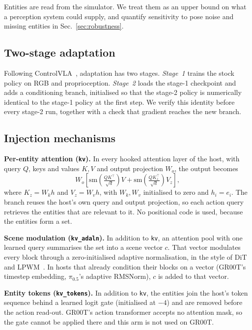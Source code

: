 \documentclass[letterpaper, 10pt, journal, twoside]{IEEEtran}
\newcommand{\arm}[1]{\texttt{#1}}
\begin{document}
Entities are read from the simulator. We treat them as an upper bound on
what a perception system could supply, and quantify sensitivity to pose
noise and missing entities in Sec.~\ref{sec:robustness}.

\subsection{Two-stage adaptation}
Following ControlVLA~\cite{li2025controlvla}, adaptation has two stages.
\textit{Stage~1} trains the stock policy on RGB and proprioception.
\textit{Stage~2} loads the stage-1 checkpoint and adds a conditioning branch,
initialised so that the stage-2 policy is numerically identical to the
stage-1 policy at the first step. We verify this identity before every
stage-2 run, together with a check that gradient reaches the new branch.

\subsection{Injection mechanisms}
\label{sec:injection}

\textbf{Per-entity attention (\arm{kv}).} In every hooked attention layer of
the host, with query $Q$, keys and values $K,V$ and output projection $W_o$,
the output becomes
\begin{equation}
  W_o\!\left[\mathrm{sm}\!\left(\tfrac{QK^\top}{\sqrt d}\right)V +
  \mathrm{sm}\!\left(\tfrac{QK_z^\top}{\sqrt d}\right)V_z\right],
  \label{eq:kv}
\end{equation}
where $K_z{=}W_k h$ and $V_z{=}W_v h$, with $W_k,W_v$ initialised to zero and
$h_i{=}e_i$. The branch reuses the host's own query and output projection,
so each action query retrieves the entities that are relevant to it. No
positional code is used, because the entities form a set.

\textbf{Scene modulation (\arm{kv\_adaln}).} In addition to \arm{kv}, an
attention pool with one learned query summarises the set into a scene vector
$c$. That vector modulates every block through a zero-initialised adaptive
normalisation, in the style of DiT and LPWM~\cite{lpwm}. In hosts that
already condition their blocks on a vector (GR00T's timestep embedding,
$\pi_{0.5}$'s adaptive RMSNorm), $c$ is added to that vector.

\textbf{Entity tokens (\arm{kv\_tokens}).} In addition to \arm{kv}, the
entities join the host's token sequence behind a learned logit gate
(initialised at $-4$) and are removed before the action read-out. GR00T's
action transformer accepts no attention mask, so the gate cannot be applied
there and this arm is not used on GR00T.
\end{document}
